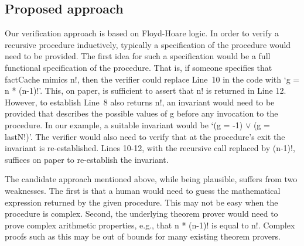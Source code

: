 \subsection{Proposed approach}



Our verification approach is based on Floyd-Hoare logic. In order to verify a recursive procedure
inductively, typically a specification of the procedure would need to be
provided. The first idea for such a specification would be a full
functional specification of the procedure. That is, if someone specifies
that factCache mimics n!, then the verifier could replace Line~10 in the
code with `g = n * (n-1)!'. This, on paper, is sufficient to assert that n!
is returned in Line 12. However, to establish Line~8 also returns n!, an
invariant would need to be provided that describes the possible values of g
before any invocation to the procedure. In our example, a suitable
invariant would be `(g = -1) $\vee$ (g = lastN!)'. The verifier would also
need to verify that at the procedure's exit the invariant is
re-established. Lines 10-12, with the recursive call replaced by (n-1)!,
suffices on paper  to re-establish the invariant.

The candidate approach mentioned above, while being plausible, suffers from
two weaknesses. The first is that a human would need to guess the
mathematical expression returned by the given procedure. This may not be
easy when the procedure is complex. Second, the underlying theorem prover
would need to prove complex arithmetic properties, e.g., that n * (n-1)! is
equal to n!. Complex proofs such as this may be out of bounds for many
existing theorem provers.

